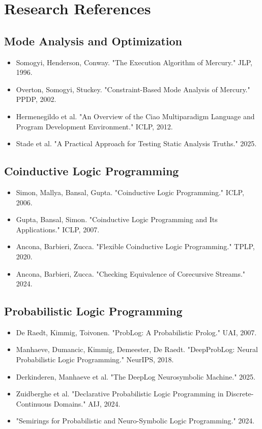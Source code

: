 \documentclass[11pt]{article}
\begin{document}
\section{Research References}
\label{sec:org82d6bf7}

\subsection{Mode Analysis and Optimization}
\label{sec:org44566d9}
\begin{itemize}
\item Somogyi, Henderson, Conway. "The Execution Algorithm of Mercury." JLP, 1996.
\item Overton, Somogyi, Stuckey. "Constraint-Based Mode Analysis of Mercury." PPDP, 2002.
\item Hermenegildo et al. "An Overview of the Ciao Multiparadigm Language and Program Development Environment." ICLP, 2012.
\item Stade et al. "A Practical Approach for Testing Static Analysis Truths." 2025.
\end{itemize}
\subsection{Coinductive Logic Programming}
\label{sec:org55ec01a}
\begin{itemize}
\item Simon, Mallya, Bansal, Gupta. "Coinductive Logic Programming." ICLP, 2006.
\item Gupta, Bansal, Simon. "Coinductive Logic Programming and Its Applications." ICLP, 2007.
\item Ancona, Barbieri, Zucca. "Flexible Coinductive Logic Programming." TPLP, 2020.
\item Ancona, Barbieri, Zucca. "Checking Equivalence of Corecursive Streams." 2024.
\end{itemize}
\subsection{Probabilistic Logic Programming}
\label{sec:org01f4a4e}
\begin{itemize}
\item De Raedt, Kimmig, Toivonen. "ProbLog: A Probabilistic Prolog." UAI, 2007.
\item Manhaeve, Dumancic, Kimmig, Demeester, De Raedt. "DeepProbLog: Neural Probabilistic Logic Programming." NeurIPS, 2018.
\item Derkinderen, Manhaeve et al. "The DeepLog Neurosymbolic Machine." 2025.
\item Zuidberghe et al. "Declarative Probabilistic Logic Programming in Discrete-Continuous Domains." AIJ, 2024.
\item "Semirings for Probabilistic and Neuro-Symbolic Logic Programming." 2024.
\end{itemize}
\end{document}
